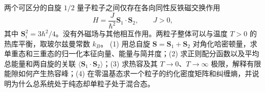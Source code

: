 两个可区分的自旋 \(1/2\) 量子粒子之间仅存在各向同性反铁磁交换作用
\[
H=\frac{J}{\hbar^2}\boldsymbol S_1\cdot\boldsymbol S_2,\qquad J>0,
\]
其中 \(\boldsymbol S_i^2=3\hbar^2/4\)。没有外磁场与其他相互作用。两粒子整体可以与温度 \(T>0\) 的热库平衡，取玻尔兹曼常数 \(k_B\)。
(1) 用总自旋 \(\boldsymbol S=\boldsymbol S_1+\boldsymbol S_2\) 对角化哈密顿量，求单重态和三重态的归一化本征向量、能量与简并度；(2) 求正则配分函数以及平均总能量和两自旋的关联 \(\langle\boldsymbol S_1\cdot\boldsymbol S_2\rangle\)；(3) 求热容及其 \(T\to0\)、\(T\to\infty\) 极限，解释有限能隙如何产生热容峰；(4) 在零温基态求一个粒子的约化密度矩阵和纠缠熵，并说明为什么总系统处于纯态却单粒子处于混合态。
